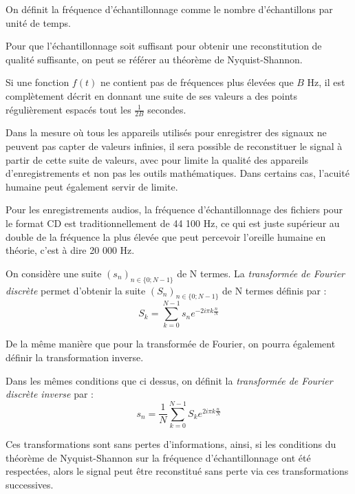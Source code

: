 	\begin{mydef}
		On définit la fréquence d'échantillonnage comme le nombre d'échantillons par unité de temps.  
	\end{mydef}
		Pour que l'échantillonnage soit suffisant pour obtenir une reconstitution de qualité suffisante, on peut se référer au théorème de Nyquist-Shannon. 
		
	\begin{mythm}
		Si une fonction $f(t)$ ne contient pas de fréquences plus élevées que $B$ Hz, il est complètement décrit en donnant une suite de ses valeurs a des points régulièrement espacés tout les $\frac{1}{2B}$ secondes.
	\end{mythm}
	
	Dans la mesure où tous les appareils utilisés pour enregistrer des signaux ne peuvent pas capter de valeurs infinies, il sera possible de reconstituer le signal à partir de cette suite de valeurs, avec pour limite la qualité des appareils d'enregistrements et non pas les outils mathématiques. Dans certains cas, l'acuité humaine peut également servir de limite.
	
	\begin{myexmpl}
		 Pour les enregistrements audios, la fréquence d'échantillonnage des fichiers pour le format CD est traditionnellement de 44 100 Hz, ce qui est juste supérieur au double de la fréquence la plus élevée que peut percevoir l'oreille humaine en théorie, c'est à dire 20 000 Hz. 
	\end{myexmpl}
	
	\begin{mydef}
			On considère une suite $(s_n)_{n\in \{0; N -1 \}}$ de N termes. La \textit{transformée de Fourier discrète} permet d'obtenir la suite  $(S_n)_{n\in \{0; N -1 \}}$ de N termes définis par :
			$$ S_k = \sum_{k=0}^{N-1}s_n e^{-2i\pi k\frac{n}{N}} $$
	\end{mydef}
		De la même manière que pour la transformée de Fourier, on pourra également définir la transformation inverse.
		
	\begin{mydef}
		Dans les mêmes conditions que ci dessus, on définit la \textit{transformée de Fourier discrète inverse} par :
			$$ s_n =\frac{1}{N} \sum_{k=0}^{N-1}S_k e^{2i\pi k\frac{n}{N}} $$
	\end{mydef}
	
	Ces transformations sont sans pertes d'informations, ainsi, si les conditions du théorème de Nyquist-Shannon sur la fréquence d'échantillonnage ont été respectées, alors le signal peut être reconstitué sans perte via ces transformations successives. 
	
